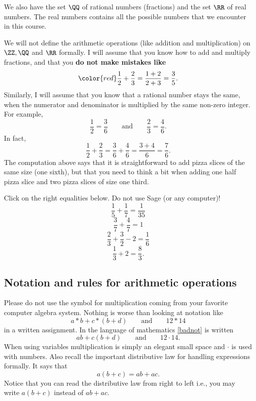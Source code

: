 \documentclass{article}
\begin{document}
We also have
the set $\QQ$ of rational numbers (fractions) and the set
$\RR$ of real numbers. The real numbers
contains all the possible numbers that we encounter in 
this course.

We will not define the
arithmetic operations (like addition and multiplication) on $\ZZ, \QQ$
and $\RR$ 
formally. I will assume that you know how to add and multiply fractions,
and that you \textbf{do not make mistakes like}
$$
\color{red}
\frac{1}{2} + \frac{2}{3} = \frac{1+2}{2+3}=\frac{3}{5}.
$$
Similarly, I will assume that you know that a rational number stays the
same, when the numerator and denominator is multiplied by the same non-zero 
integer. For example,
$$
\frac{1}{2} = \frac{3}{6}\qquad\text{and}\qquad \frac{2}{3} = \frac{4}{6}.
$$
In fact, 
$$
\frac{1}{2} + \frac{2}{3} = \frac{3}{6} + \frac{4}{6} = \frac{3 + 4}{6} = \frac{7}{6}.
$$
The computation above says that it is straightforward to add pizza slices of the
same size (one sixth), but that you need to think a bit when adding one half pizza slice and
two pizza slices of size one third.

\begin{quizexercise}[showhide]
  \begin{quiz}
\question
Click on the right equalities below. Do not use Sage (or any computer)!
$$
\frac{1}{5} + \frac{1}{7} = \frac{1}{35}
$$
$$
\frac{3}{7} + \frac{4}{7} = 1
$$
$$
\frac{2}{3} + \frac{3}{2} - 2 = \frac{1}{6}
$$
$$
\frac{1}{3} + 2 = \frac{8}{3}.
$$
\end{quiz}
\end{quizexercise}


\subsection{Notation and rules for arithmetic operations}

Please do not use the symbol for multiplication coming from your favorite computer algebra system. Nothing is worse than looking at notation like
\begin{equation}\label{badnot}
a*b + c*(b+d)\qquad \text{and}\qquad 12*14
\end{equation}
in a written assignment. In the language of mathematics \eqref{badnot} is written
\begin{equation}
a b + c (b+d)\qquad \text{and}\qquad 12\cdot 14.
\end{equation}
When using variables multiplication is simply an elegant small space and $\cdot$ is
used with numbers. Also recall the important distributive law for handling
expressions formally. It says that
\begin{equation}\label{distrlaw}
a (b + c) = a b + a c.
\end{equation}
Notice that you can read the distributive law from right to left i.e., you
may write $a (b + c)$ instead of $a b + a c$.
\end{document}
